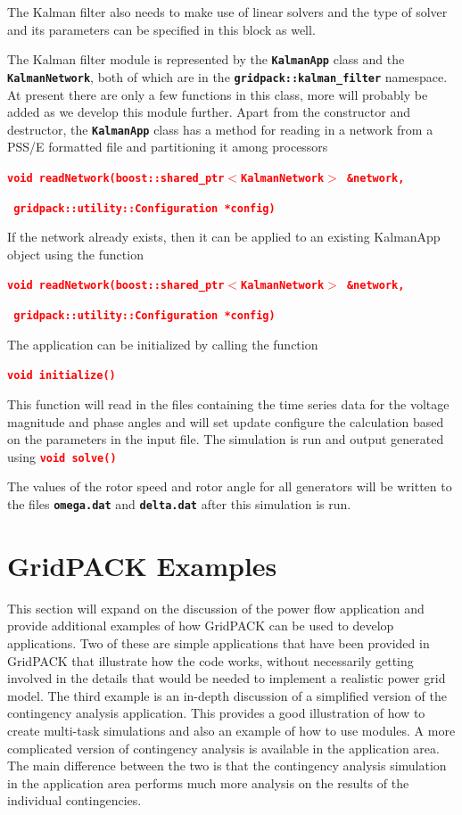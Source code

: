 \documentclass[12pt]{report} %
\begin{document}
The Kalman filter also needs to make use of linear solvers and the type of solver and its parameters can be specified in this block as well.

The Kalman filter module is represented by the \texttt{\textbf{KalmanApp}} class and the \texttt{\textbf{KalmanNetwork}}, both of which are in the \texttt{\textbf{gridpack::kalman\_filter}} namespace. At present there are only a few functions in this class, more will probably be added as we develop this module further. Apart from the constructor and destructor, the \texttt{\textbf{KalmanApp}} class has a method for reading in a network from a PSS/E formatted file and partitioning it among processors

\textcolor{red}{\texttt{\textbf{void readNetwork(boost::shared\_ptr$\boldsymbol{\mathrm{<}}$KalmanNetwork$\boldsymbol{\mathrm{>}}$ \&network,}}}

\textcolor{red}{\texttt{\textbf{    gridpack::utility::Configuration *config)}}}

If the network already exists, then it can be applied to an existing KalmanApp object using the function

\textcolor{red}{\texttt{\textbf{void readNetwork(boost::shared\_ptr$\boldsymbol{\mathrm{<}}$KalmanNetwork$\boldsymbol{\mathrm{>}}$ \&network,}}}

\textcolor{red}{\texttt{\textbf{    gridpack::utility::Configuration *config)}}}

The application can be initialized by calling the function

\textcolor{red}{\texttt{\textbf{void initialize()}}}

This function will read in the files containing the time series data for the voltage magnitude and phase angles and will set update configure the calculation based on the parameters in the input file. The simulation is run and output generated using
\textcolor{red}{\texttt{\textbf{void solve()}}}

The values of the rotor speed and rotor angle for all generators will be written to the files \texttt{\textbf{omega.dat}} and \texttt{\textbf{delta.dat}} after this simulation is run.

\section{GridPACK Examples}

This section will expand on the discussion of the power flow application and provide additional examples of how GridPACK can be used to develop applications. Two of these are simple applications that have been provided in GridPACK that illustrate how the code works, without necessarily getting involved in the details that would be needed to implement a realistic power grid model. The third example is an in-depth discussion of a simplified version of the contingency analysis application. This provides a good illustration of how to create multi-task simulations and also an example of how to use modules. A more complicated version of contingency analysis is available in the application area. The main difference between the two is that the contingency analysis simulation in the application area performs much more analysis on the results of the individual contingencies.
\end{document}
